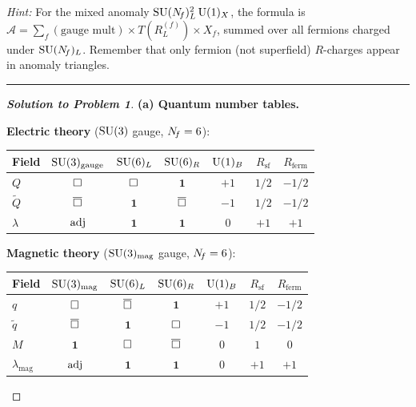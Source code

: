 \documentclass[11pt,a4paper]{article}
\begin{document}
\medskip

\noindent\textit{Hint:} For the mixed anomaly $\mathrm{SU}(N_{\!f})_L^2\,\mathrm{U}(1)_X$,
the formula is $\mathcal{A} = \sum_f (\text{gauge mult}) \times
T(R^{(f)}_L) \times X_f$, summed over all fermions charged under
$\mathrm{SU}(N_{\!f})_L$.  Remember that only fermion (not superfield) $R$-charges
appear in anomaly triangles.

\bigskip
\hrule
\bigskip

\begin{proof}[\textbf{Solution to Problem 1}]

\textbf{(a) Quantum number tables.}

\textbf{Electric theory} ($\mathrm{SU}(3)$ gauge, $N_{\!f} = 6$):

\renewcommand{\arraystretch}{1.3}
\begin{center}
\begin{tabular}{@{}l c c c c c c@{}}
\toprule
\textbf{Field} & $\mathrm{SU}(3)_{\mathrm{gauge}}$ & $\mathrm{SU}(6)_L$ & $\mathrm{SU}(6)_R$
  & $\mathrm{U}(1)_B$ & $R_{\mathrm{sf}}$ & $R_{\mathrm{ferm}}$ \\
\midrule
$Q$ & $\square$ & $\square$ & $\mathbf{1}$ & $+1$ & $1/2$ & $-1/2$ \\
$\widetilde{Q}$ & $\overline{\square}$ & $\mathbf{1}$ & $\overline{\square}$ & $-1$
  & $1/2$ & $-1/2$ \\
$\lambda$ & $\mathrm{adj}$ & $\mathbf{1}$ & $\mathbf{1}$ & $0$ & $+1$ & $+1$ \\
\bottomrule
\end{tabular}
\end{center}

\textbf{Magnetic theory} ($\mathrm{SU}(3)_{\mathrm{mag}}$ gauge, $N_{\!f} = 6$):

\begin{center}
\begin{tabular}{@{}l c c c c c c@{}}
\toprule
\textbf{Field} & $\mathrm{SU}(3)_{\mathrm{mag}}$ & $\mathrm{SU}(6)_L$ & $\mathrm{SU}(6)_R$
  & $\mathrm{U}(1)_B$ & $R_{\mathrm{sf}}$ & $R_{\mathrm{ferm}}$ \\
\midrule
$q$ & $\square$ & $\overline{\square}$ & $\mathbf{1}$ & $+1$
  & $1/2$ & $-1/2$ \\
$\widetilde{q}$ & $\overline{\square}$ & $\mathbf{1}$ & $\square$ & $-1$
  & $1/2$ & $-1/2$ \\
$M$ & $\mathbf{1}$ & $\square$ & $\overline{\square}$ & $0$
  & $1$ & $0$ \\
$\lambda_{\mathrm{mag}}$ & $\mathrm{adj}$ & $\mathbf{1}$ & $\mathbf{1}$
  & $0$ & $+1$ & $+1$ \\
\bottomrule
\end{tabular}
\end{center}


\end{proof}
\end{document}
